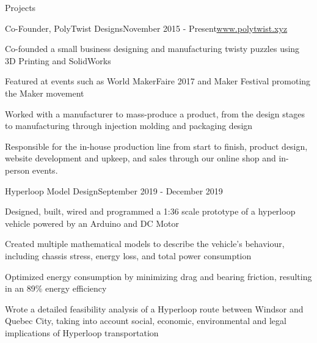 \documentclass{resume} %
\begin{document}
\begin{rSection}{Projects}

\begin{rSubsection}{Co-Founder, PolyTwist Designs}{November 2015 - Present}{\url{www.polytwist.xyz}}{}
\item Co-founded a small business designing and manufacturing twisty puzzles using 3D Printing and SolidWorks
\item Featured at events such as World MakerFaire 2017 and Maker Festival promoting the Maker movement
\item Worked with a manufacturer to mass-produce a product, from the design stages to manufacturing through injection molding and packaging design
\item Responsible for the in-house production line from start to finish, product design, website development and upkeep, and sales through our online shop and in-person events.
\end{rSubsection}

\begin{rSubsection}{Hyperloop Model Design}{September 2019 - December 2019}{}{}
\item Designed, built, wired and programmed a 1:36 scale prototype of a hyperloop vehicle powered by an Arduino and DC Motor
\item Created multiple mathematical models to describe the vehicle's behaviour, including chassis stress, energy loss, and total power consumption
\item Optimized energy consumption by minimizing drag and bearing friction, resulting in an 89\% energy efficiency
\item Wrote a detailed feasibility analysis of a Hyperloop route between Windsor and Quebec City, taking into account social, economic, environmental and legal implications of Hyperloop transportation
\end{rSubsection}

\end{rSection}


\end{document}
